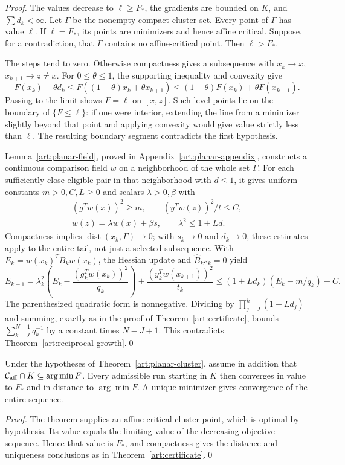 \begin{proof}
The values decrease to $\ell\ge F_*$, the gradients are bounded on $K$, and
$\sum d_k<\infty$. Let $\Gamma$ be the nonempty compact cluster set.
Every point of $\Gamma$ has value $\ell$. If $\ell=F_*$, its points are
minimizers and hence affine critical. Suppose, for a contradiction, that
$\Gamma$ contains no affine-critical point. Then $\ell>F_*$.

The steps tend to zero. Otherwise compactness gives a subsequence with
$x_k\to x$, $x_{k+1}\to z\ne x$. For $0\le\theta\le1$, the supporting
inequality and convexity give
\[
 F(x_k)-\theta d_k
 \le F((1-\theta)x_k+\theta x_{k+1})
 \le(1-\theta)F(x_k)+\theta F(x_{k+1}).
\]
Passing to the limit shows $F=\ell$ on $[x,z]$. Such level points lie on
the boundary of $\{F\le\ell\}$: if one were interior, extending the line
from a minimizer slightly beyond that point and applying convexity would
give value strictly less than $\ell$. The resulting boundary segment
contradicts the first hypothesis.

Lemma~\ref{art:planar-field}, proved in Appendix~\ref{art:planar-appendix},
constructs a continuous comparison field $w$ on a neighborhood of the whole
set $\Gamma$. For each sufficiently close eligible pair in that neighborhood with $d\le1$,
it gives uniform constants $m>0,C,L\ge0$ and scalars $\lambda>0,\beta$ with
\[
 \begin{gathered}
 (g^Tw(x))^2\ge m,\qquad (y^Tw(z))^2/t\le C,\\
 w(z)=\lambda w(x)+\beta s,\qquad \lambda^2\le1+Ld.
 \end{gathered}
\]
Compactness implies $\operatorname{dist}(x_k,\Gamma)\to0$; with $s_k\to0$ and $d_k\to0$, these estimates
apply to the entire tail, not just a selected subsequence.
With $E_k=w(x_k)^TB_kw(x_k)$, the Hessian update and $\widehat B_ks_k=0$ yield
\[
 E_{k+1}=
 \lambda_k^2\left(E_k-\frac{(g_k^Tw(x_k))^2}{q_k}\right)
       +\frac{(y_k^Tw(x_{k+1}))^2}{t_k}
 \le(1+Ld_k)(E_k-m/q_k)+C.
\]
The parenthesized quadratic form is nonnegative. Dividing by
$\prod_{j=J}^{k}(1+Ld_j)$ and summing, exactly as in the proof of
Theorem~\ref{art:certificate}, bounds $\sum_{k=J}^{N-1}q_k^{-1}$ by a constant
times $N-J+1$. This contradicts Theorem~\ref{art:reciprocal-growth}.\qed
\end{proof}

\begin{corollary}\label{art:planar-convergence}
Under the hypotheses of Theorem~\ref{art:planar-cluster}, assume in addition
that $\mathcal C_{\rm aff}\cap K\subseteq\arg\min F$. Every admissible run
starting in $K$ then converges in value to $F_*$ and in distance to
$\arg\min F$. A unique minimizer gives convergence of the entire sequence.
\end{corollary}
\begin{proof}
The theorem supplies an affine-critical cluster point, which is optimal by
hypothesis. Its value equals the limiting value of the decreasing objective
sequence. Hence that value is $F_*$, and compactness gives the distance and
uniqueness conclusions as in Theorem~\ref{art:certificate}.\qed
\end{proof}

